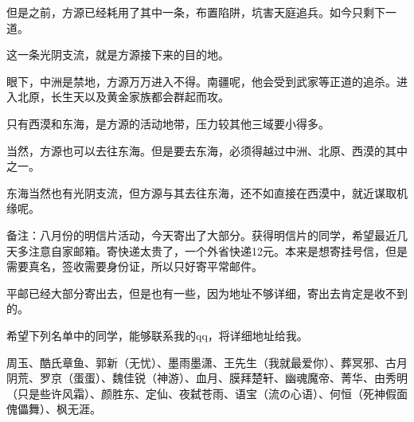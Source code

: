 \begin{this_body}
但是之前，方源已经耗用了其中一条，布置陷阱，坑害天庭追兵。如今只剩下一道。

这一条光阴支流，就是方源接下来的目的地。

眼下，中洲是禁地，方源万万进入不得。南疆呢，他会受到武家等正道的追杀。进入北原，长生天以及黄金家族都会群起而攻。

只有西漠和东海，是方源的活动地带，压力较其他三域要小得多。

当然，方源也可以去往东海。但是要去东海，必须得越过中洲、北原、西漠的其中之一。

东海当然也有光阴支流，但方源与其去往东海，还不如直接在西漠中，就近谋取机缘呢。

备注：八月份的明信片活动，今天寄出了大部分。获得明信片的同学，希望最近几天多注意自家邮箱。寄快递太贵了，一个外省快递12元。本来是想寄挂号信，但是需要真名，签收需要身份证，所以只好寄平常邮件。

平邮已经大部分寄出去，但是也有一些，因为地址不够详细，寄出去肯定是收不到的。

希望下列名单中的同学，能够联系我的qq，将详细地址给我。

周玉、酷氏章鱼、郭新（无忧）、墨雨墨潇、王先生（我就最爱你）、葬冥邪、古月阴荒、罗京（蛋蛋）、魏佳锐（神游）、血月、膜拜楚轩、幽魂魔帝、菁华、由秀明（只是些许风霜）、颜胜东、定仙、夜弑苍雨、语宝（流の心语）、何恒（死神假面傀儡舞）、枫无涯。

\end{this_body}

